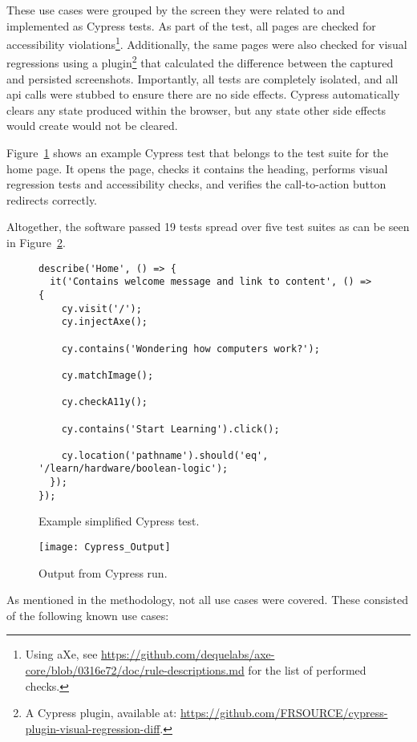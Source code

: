 These use cases were grouped by the screen they were related to and implemented as Cypress tests.
As part of the test, all pages are checked for accessibility violations\footnote{Using aXe, see \url{https://github.com/dequelabs/axe-core/blob/0316e72/doc/rule-descriptions.md} for the list of performed checks.}.
Additionally, the same pages were also checked for visual regressions using a plugin\footnote{A Cypress plugin, available at: \url{https://github.com/FRSOURCE/cypress-plugin-visual-regression-diff}.} that calculated the difference between the captured and persisted screenshots.
Importantly, all tests are completely isolated, and all \gls{api} calls were stubbed to ensure there are no side effects.
Cypress automatically clears any state produced within the browser, but any state other side effects would create would not be cleared.

Figure~\ref{fig:test-cypress-example} shows an example Cypress test that belongs to the test suite for the home page.
It opens the page, checks it contains the heading, performs visual regression tests and accessibility checks, and verifies the call-to-action button redirects correctly.

Altogether, the software passed 19 tests spread over five test suites as can be seen in Figure~\ref{fig:test-cypress}.

\begin{figure}[H]
\begin{verbatim}
describe('Home', () => {
  it('Contains welcome message and link to content', () => {
    cy.visit('/');
    cy.injectAxe();

    cy.contains('Wondering how computers work?');

    cy.matchImage();

    cy.checkA11y();

    cy.contains('Start Learning').click();

    cy.location('pathname').should('eq', '/learn/hardware/boolean-logic');
  });
});
\end{verbatim}
    \caption{Example simplified Cypress test.}
    \label{fig:test-cypress-example}
\end{figure}

\begin{figure}[H]
    \texttt{[image: Cypress\_Output]}
    \caption{Output from Cypress run.}
    \label{fig:test-cypress}
\end{figure}

As mentioned in the methodology, not all use cases were covered.
These consisted of the following known use cases:


